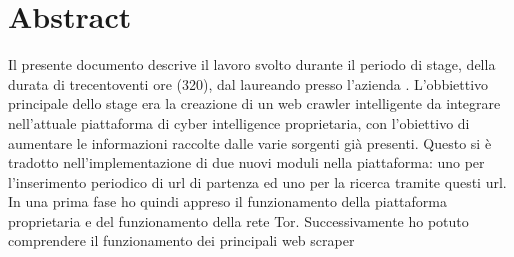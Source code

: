 
\cleardoublepage
{}
{}
\begingroup
\let\clearpage\relax
\let\cleardoublepage\relax
\let\cleardoublepage\relax

\chapter*{Abstract}

Il presente documento descrive il lavoro svolto durante il periodo di stage, della durata di trecentoventi ore (320), dal laureando \myName{} presso l'azienda \myCompany{} \myCompanyRag{}.
L'obbiettivo principale dello stage era la creazione di un web crawler intelligente da integrare nell’attuale piattaforma
di cyber intelligence proprietaria, con l’obiettivo di aumentare le informazioni raccolte dalle varie
sorgenti già presenti. Questo si è tradotto nell'implementazione di due nuovi moduli nella piattaforma: uno per l'inserimento periodico di url di partenza ed uno per la ricerca tramite questi url. \newline{}
In una prima fase ho quindi appreso il funzionamento della piattaforma proprietaria e del funzionamento della rete Tor. Successivamente ho potuto comprendere il funzionamento dei principali web scraper 

%
%

\endgroup			

\vfill

